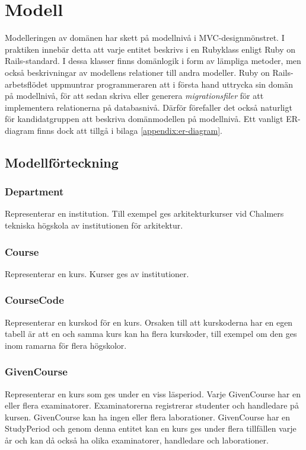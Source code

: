 \section{Modell}

Modelleringen av domänen har skett på modellnivå i MVC-designmönstret. 
I praktiken innebär detta att varje entitet beskrivs i en Rubyklass enligt Ruby on Rails-standard.
I dessa klasser finns domänlogik i form av lämpliga metoder, men också beskrivningar av 
modellens relationer till andra modeller.
Ruby on Rails-arbetsflödet uppmuntrar programmeraren att i första hand uttrycka sin domän på modellnivå,
för att sedan skriva eller generera \emph{migrationsfiler} för att implementera relationerna på databasnivå.
Därför förefaller det också naturligt för kandidatgruppen att beskriva domänmodellen på modellnivå.
Ett vanligt ER-diagram finns dock att tillgå i bilaga \ref{appendix:er-diagram}.

\subsection{Modellförteckning}
\subsubsection{Department}
Representerar en institution. Till exempel ges arkitekturkurser vid Chalmers tekniska högskola av institutionen för arkitektur.

\subsubsection{Course}
Representerar en kurs. Kurser ges av institutioner.

\subsubsection{CourseCode}
Representerar en kurskod för en kurs. Orsaken till att kurskoderna har en egen tabell är att en och samma kurs kan ha flera kurskoder, till exempel om den ges inom ramarna för flera högskolor.

\subsubsection{GivenCourse}
Representerar en kurs som ges under en viss läsperiod. Varje GivenCourse har en eller flera examinatorer. Examinatorerna registrerar studenter och handledare på kursen. GivenCourse kan ha ingen eller flera laborationer. GivenCourse har en StudyPeriod och genom denna entitet kan en kurs ges under flera tillfällen varje år och kan då också ha olika examinatorer, handledare och laborationer.

